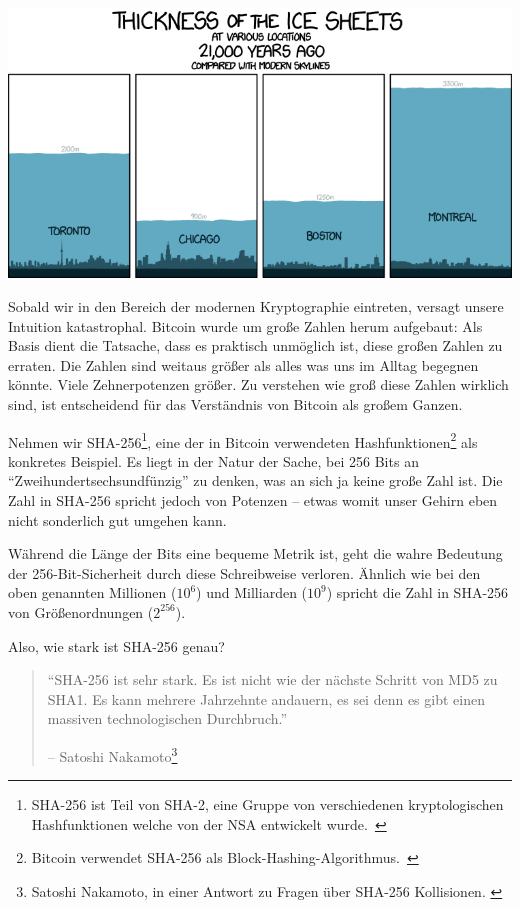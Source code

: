 \begin{center}
  \includegraphics[width=\textwidth]{assets/images/xkcd-1225.png}
  \label{fig:xkcd-1225}
\end{center}

Sobald wir in den Bereich der modernen Kryptographie eintreten, versagt unsere
Intuition katastrophal. Bitcoin wurde um große Zahlen herum aufgebaut: Als Basis dient
die Tatsache, dass es praktisch unmöglich ist, diese großen Zahlen zu erraten. Die Zahlen sind
weitaus größer als alles was uns im Alltag begegnen könnte. Viele Zehnerpotenzen
größer. Zu verstehen wie groß diese Zahlen wirklich sind, ist entscheidend für
das Verständnis von Bitcoin als großem Ganzen.

Nehmen wir SHA-256\footnote{SHA-256 ist Teil von SHA-2, eine Gruppe von
verschiedenen kryptologischen Hashfunktionen welche von der NSA entwickelt
wurde.~\cite{wiki:sha2}}, eine der in Bitcoin verwendeten
Hashfunktionen\footnote{Bitcoin verwendet SHA-256 als
Block-Hashing-Algorithmus.~\cite{btcwiki:block-hashing}} als konkretes Beispiel.
Es liegt in der Natur der Sache, bei 256 Bits an
\enquote{Zweihundertsechsundfünzig} zu denken, was an sich ja keine große Zahl
ist. Die Zahl in SHA-256 spricht jedoch von Potenzen -- etwas womit unser Gehirn
eben nicht sonderlich gut umgehen kann.

Während die Länge der Bits eine bequeme Metrik ist, geht die wahre Bedeutung der
256-Bit-Sicherheit durch diese Schreibweise verloren. Ähnlich wie bei den oben
genannten Millionen ($10^6$) und Milliarden ($10^9$) spricht die Zahl in SHA-256
von Größenordnungen ($2^{256}$).

Also, wie stark ist SHA-256 genau?

\begin{quotation}\begin{samepage}
\enquote{SHA-256 ist sehr stark. Es ist nicht wie der nächste Schritt von MD5 zu
SHA1. Es kann mehrere Jahrzehnte andauern, es sei denn es gibt einen massiven
technologischen Durchbruch.}
\begin{flushright} -- Satoshi Nakamoto\footnote{Satoshi Nakamoto, in einer
Antwort zu Fragen über SHA-256 Kollisionen. \cite{satoshi-sha256}}
\end{flushright}\end{samepage}\end{quotation}

